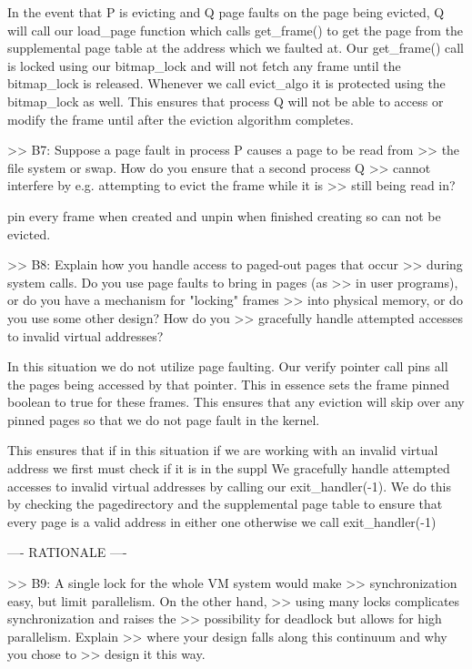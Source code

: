 In the event that P is evicting and Q page faults on the page being evicted,
Q will call our load_page function which calls get_frame() to get the page
from the supplemental page table at the address which we faulted at. 
Our get_frame() call is locked using our bitmap_lock and will not fetch 
any frame until the bitmap_lock is released. Whenever we call evict_algo 
it is protected using the bitmap_lock as well. This ensures that process 
Q will not be able to access or modify the frame until after the eviction 
algorithm completes. 

>> B7: Suppose a page fault in process P causes a page to be read from
>> the file system or swap.  How do you ensure that a second process Q
>> cannot interfere by e.g. attempting to evict the frame while it is
>> still being read in?

pin every frame when created and unpin when finished creating so can not be
evicted. 

>> B8: Explain how you handle access to paged-out pages that occur
>> during system calls.  Do you use page faults to bring in pages (as
>> in user programs), or do you have a mechanism for "locking" frames
>> into physical memory, or do you use some other design?  How do you
>> gracefully handle attempted accesses to invalid virtual addresses?

In this situation we do not utilize page faulting. Our verify pointer call
pins all the pages being accessed by that pointer. This in essence sets the
frame pinned boolean to true for these frames. This ensures that any eviction
will skip over any pinned pages so that we do not page fault in the kernel.

This ensures that if in this situation if we are working with an invalid
virtual address we first must check if it is in the suppl
We gracefully handle attempted accesses to invalid virtual addresses by
calling our exit_handler(-1). We do this by checking the pagedirectory
and the supplemental page table to ensure that every page is a valid
address in either one otherwise we call exit_handler(-1)


---- RATIONALE ----

>> B9: A single lock for the whole VM system would make
>> synchronization easy, but limit parallelism.  On the other hand,
>> using many locks complicates synchronization and raises the
>> possibility for deadlock but allows for high parallelism.  Explain
>> where your design falls along this continuum and why you chose to
>> design it this way.

